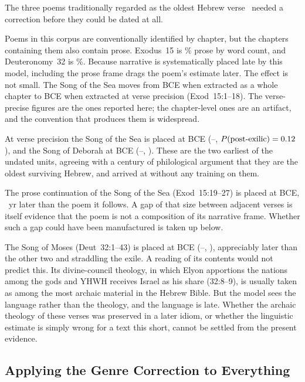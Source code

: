 \documentclass[10pt,letterpaper]{article}
\begin{document}
The three poems traditionally regarded as the oldest Hebrew
verse~\cite{Albright1968,Cross1975,Robertson1972} needed a correction before
they could be dated at all.

Poems in this corpus are conventionally identified by chapter, but the chapters
containing them also contain prose.  Exodus~15 is \poemSeaProseFrac\% prose by
word count, and Deuteronomy~32 is \poemMosesProseFrac\%.  Because narrative is
systematically placed late by this model, including the prose frame drags the
poem's estimate later.  The effect is not small.  The Song of the Sea moves from
\poemSeaChap{} BCE when extracted as a whole chapter to \poemSea{} BCE when
extracted at verse precision (Exod~15:1--18).  The verse-precise figures are the
ones reported here; the chapter-level ones are an artifact, and the convention
that produces them is widespread.

At verse precision the Song of the Sea is placed at \poemSea{} BCE
(\poemSealo--\poemSeahi, $P(\text{post-exilic}) = 0.12$), and the Song
of Deborah at \poemDeb{} BCE (\poemDeblo--\poemDebhi, \poemDebpost).  These are
the two earliest of the \NTargets{} undated units, agreeing with a century of
philological argument that they are the oldest surviving Hebrew, and arrived at
without any training on them.

The prose continuation of the Song of the Sea (Exod~15:19--27) is placed at
\poemSeaProse{} BCE, \poemSeaGap~yr later than the poem it follows.  A gap of
that size between adjacent verses is itself evidence that the poem is not a
composition of its narrative frame.  Whether such a gap could have been
manufactured is taken up below.

The Song of Moses (Deut~32:1--43) is placed at \poemMoses{} BCE
(\poemMoseslo--\poemMoseshi, \poemMosespost), appreciably later than the other
two and straddling the exile.  A reading of its contents would not predict this.
Its divine-council theology, in which Elyon apportions the nations among the
gods and YHWH receives Israel as his share (32:8--9), is usually taken as among
the most archaic material in the Hebrew Bible.  But the model sees the language rather than the theology, and the language is
late.  Whether the archaic theology of these verses was preserved in a later
idiom, or whether the linguistic estimate is simply wrong for a text this short,
cannot be settled from the present evidence.

\subsection*{Applying the Genre Correction to Everything}
\end{document}
